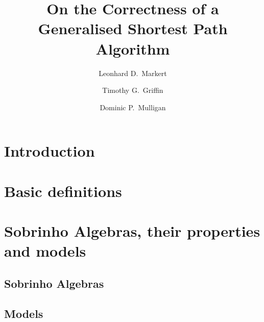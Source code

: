 \documentclass{llncs}
\begin{document}

\title{On the Correctness of a Generalised Shortest Path Algorithm}
\author{Leonhard D.~Markert \and Timothy G.~Griffin \and Dominic P.~Mulligan}

\maketitle

\begin{abstract}

\end{abstract}

\section{Introduction}
\label{sect.introduction}



\section{Basic definitions}
\label{sect.basic.definitions}



\section{Sobrinho Algebras, their properties and models}
\label{sect.path.algebras.their.properties.and.models}

\subsection{Sobrinho Algebras}
\label{subsect.path.algebras}



\subsection{Models}
\label{subsect.models}
\end{document}
